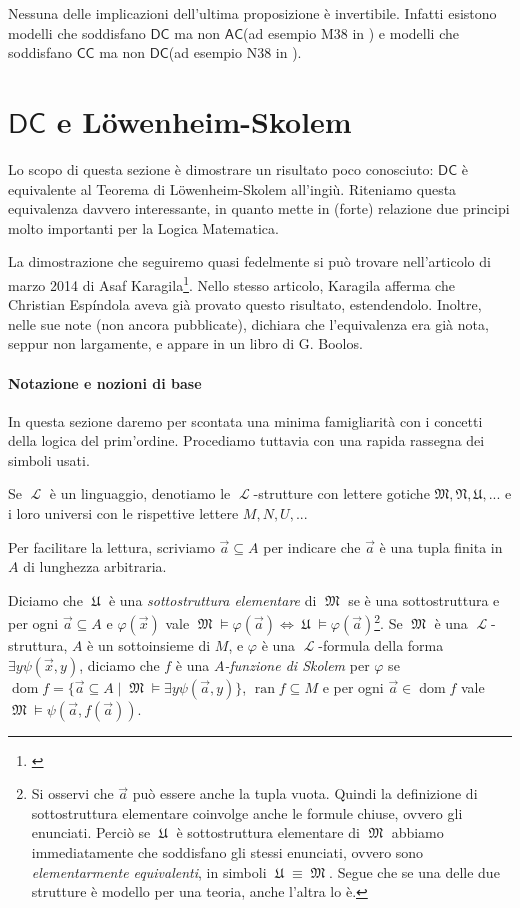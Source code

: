 \documentclass[12pt,a4paper]{report}
\theoremstyle{definition}
\theoremstyle{num.custom-title}
\DeclareMathOperator{\dom}{dom}
\DeclareMathOperator{\ran}{ran}
\DeclareMathOperator{\LL}{\mathcal{L}}
\DeclareMathOperator{\M}{\mathfrak{M}}
\DeclareMathOperator{\U}{\mathfrak{U}}
\DeclareMathOperator{\sse}{\subseteq}
\newcommand{\AC}{\ensuremath{\mathsf{AC}}\xspace}
\newcommand{\CC}{\ensuremath{\mathsf{CC}}\xspace}
\newcommand{\DC}{\ensuremath{\mathsf{DC}}\xspace}
\renewcommand{\phi}{\varphi}
\begin{document}
Nessuna delle implicazioni dell'ultima proposizione è invertibile. Infatti esistono modelli che soddisfano \DC ma non \AC (ad esempio M38 in \cite{HoRu98:Herrlich}) e modelli che soddisfano \CC ma non \DC (ad esempio N38 in \cite{HoRu98:Herrlich}).

\section*{\DC e Löwenheim-Skolem}

Lo scopo di questa sezione è dimostrare un risultato poco conosciuto: \DC è equivalente al Teorema di Löwenheim-Skolem all'ingiù. Riteniamo questa equivalenza davvero interessante, in quanto mette in (forte) relazione due principi molto importanti per la Logica Matematica.

La dimostrazione che seguiremo quasi fedelmente si può trovare nell'articolo di marzo 2014 di Asaf Karagila\footnote{\cite{Kar2014:web}}. Nello stesso articolo, Karagila afferma che Christian Espíndola aveva già provato questo risultato, estendendolo. Inoltre, nelle sue note (non ancora pubblicate), dichiara che l'equivalenza era già nota, seppur non largamente, e appare in un libro di G. Boolos.

\paragraph{Notazione e nozioni di base}

In questa sezione daremo per scontata una minima famigliarità con i concetti della logica del prim'ordine. Procediamo tuttavia con una rapida rassegna dei simboli usati.

Se $\LL$ è un linguaggio, denotiamo le $\LL$-strutture con lettere gotiche $\mathfrak{M, N, U,...}$ e i loro universi con le rispettive lettere $M, N, U,...$

Per facilitare la lettura, scriviamo $\vec a \sse A$ per indicare che $\vec a$ è una tupla finita in $A$ di lunghezza arbitraria.

Diciamo che $\U$ è una \emph{sottostruttura elementare} di $\M$ se è una sottostruttura e per ogni $\vec a \sse A$ e $\phi(\vec x)$ vale $\M \models \phi(\vec a) \iff \U \models \phi (\vec a)$\footnote{Si osservi che $\vec a$ può essere anche la tupla vuota. Quindi la definizione di sottostruttura elementare coinvolge anche le formule chiuse, ovvero gli enunciati. Perciò se $\U$ è sottostruttura elementare di $\M$ abbiamo immediatamente che soddisfano gli stessi enunciati, ovvero sono \emph{elementarmente equivalenti}, in simboli $\U \equiv \M$. Segue che se una delle due strutture è modello per una teoria, anche l'altra lo è.}. Se $\M$ è una $\LL$-struttura, $A$ è un sottoinsieme di $M$, e $\phi$ è una $\LL$-formula della forma $\exists y \psi(\vec x, y)$, diciamo che $f$ è una $A$\emph{-funzione di Skolem} per $\phi$ se $\dom f = \{\vec a \sse A \mid \M \models \exists y \psi(\vec a, y)\}$, $\ran f \sse M$ e per ogni $\vec a \in \dom f$ vale $\M \models \psi(\vec a, f(\vec a))$.
\end{document}
